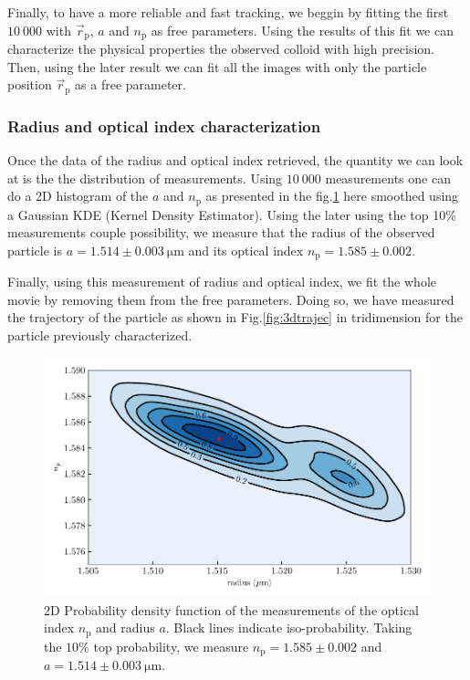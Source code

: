  
 Finally, to have a more reliable and fast tracking, we beggin by fitting the first $10~000$ with  $\vec{r}_\mathrm{p}$, $a$ and $n_\mathrm{p}$ as free parameters. Using the results of this fit we can characterize the physical properties the observed colloid with high precision. Then, using the later result we can fit all the images with only the particle position $\vec{r}_\mathrm{p}	$ as a free parameter.
 



\subsubsection{Radius and optical index characterization}
\label{sec:radius_charac}

Once the data of the radius and optical index retrieved, the quantity we can look at is the the distribution of measurements. Using $10 ~ 000$ measurements one can do a 2D histogram of the $a$ and $n_\mathrm{p}$ as presented in the fig.\ref{fig:KDErn} here smoothed using a Gaussian KDE (Kernel Density Estimator). Using the later using the top 10\% measurements couple possibility, we measure that the radius of the observed particle is $a=1.514 \pm 0.003 ~ \mathrm{\mu m} $ and its optical index $n_\mathrm{p} = 1.585 \pm 0.002$.
 




Finally, using this measurement of radius and optical index, we fit the whole movie by removing them from the free parameters. Doing so, we have measured the trajectory of the particle as shown in Fig.\ref{fig:3dtrajec} in tridimension for the particle previously characterized.

\begin{figure}[!ht]
	\centering
	\includegraphics{02_body/chapter2/images/KDErn.pdf}
	\caption{2D Probability density function of the measurements of the optical index $n_\mathrm{p}$ and radius $a$. Black lines indicate iso-probability. Taking the $10\% $ top probability, we measure $n_\mathrm{p} = 1.585 \pm 0.002$ and $a=1.514 \pm 0.003 ~ \mathrm{\mu m}$. }
	\label{fig:KDErn}
\end{figure}

